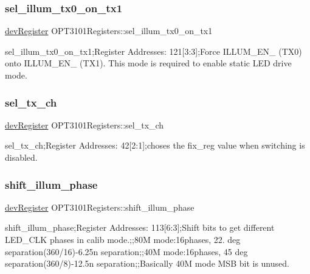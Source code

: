 \subsubsection{\texorpdfstring{sel\+\_\+illum\+\_\+tx0\+\_\+on\+\_\+tx1}{sel\_illum\_tx0\_on\_tx1}}
{\footnotesize\ttfamily \mbox{\hyperlink{classdev_register}{dev\+Register}} O\+P\+T3101\+Registers\+::sel\+\_\+illum\+\_\+tx0\+\_\+on\+\_\+tx1}



sel\+\_\+illum\+\_\+tx0\+\_\+on\+\_\+tx1;Register Addresses\+: 121\mbox{[}3\+:3\mbox{]};Force I\+L\+L\+U\+M\+\_\+\+E\+N\+\_ (T\+X0) onto I\+L\+L\+U\+M\+\_\+\+E\+N\+\_ (T\+X1). This mode is required to enable static L\+ED drive mode. 

\mbox{\label{class_o_p_t3101_registers_a304ebf6942564f0ee87e91b724d28725}} 
\subsubsection{\texorpdfstring{sel\+\_\+tx\+\_\+ch}{sel\_tx\_ch}}
{\footnotesize\ttfamily \mbox{\hyperlink{classdev_register}{dev\+Register}} O\+P\+T3101\+Registers\+::sel\+\_\+tx\+\_\+ch}



sel\+\_\+tx\+\_\+ch;Register Addresses\+: 42\mbox{[}2\+:1\mbox{]};choses the fix\+\_\+reg value when switching is disabled. 

\mbox{\label{class_o_p_t3101_registers_a94ac086d5f7e663c6dc7c3593cac3b5e}} 
\subsubsection{\texorpdfstring{shift\+\_\+illum\+\_\+phase}{shift\_illum\_phase}}
{\footnotesize\ttfamily \mbox{\hyperlink{classdev_register}{dev\+Register}} O\+P\+T3101\+Registers\+::shift\+\_\+illum\+\_\+phase}



shift\+\_\+illum\+\_\+phase;Register Addresses\+: 113\mbox{[}6\+:3\mbox{]};Shift bits to get different L\+E\+D\+\_\+\+C\+LK phases in calib mode.;;80M mode\+:16phases, 22. deg separation(360/16)-\/6.\+25n separation;;40M mode\+:16phases, 45 deg separation(360/8)-\/12.\+5n separation;;Basically 40M mode M\+SB bit is unused. 

